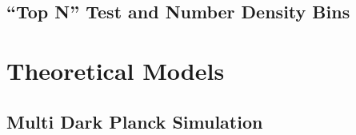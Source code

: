 \documentclass[a4paper,fleqn,usenatbib]{mnras}
\begin{document}
\subsection{``Top N'' Test and Number Density Bins}
    \label{sec:topn_intro}   


\section{Theoretical Models}
    \label{sec:model}

\subsection{Multi Dark Planck Simulation}
\end{document}
